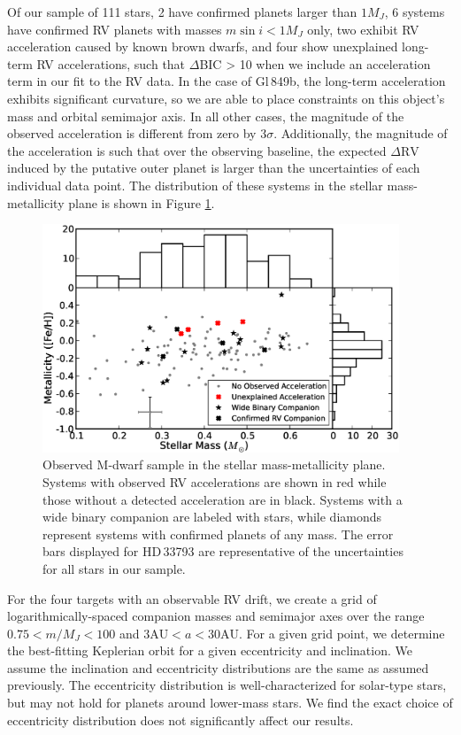 Of our sample of 111 stars, 2 have confirmed planets larger than $1 M_J$, 6 systems have confirmed RV planets with masses $m \sin i < 1 M_J$ only, two exhibit RV acceleration caused by known brown dwarfs, and four show unexplained long-term RV accelerations, such that $\Delta$BIC > 10 when we include an acceleration term in our fit to the RV data. In the case of Gl\,849b, the long-term acceleration exhibits significant curvature, so we are able to place constraints on this object's mass and orbital semimajor axis. In all other cases, the magnitude of the observed acceleration is different from zero by $3\sigma$. Additionally, the magnitude of the acceleration is such that over the observing baseline, the expected $\Delta\textrm{RV}$ induced by the putative outer planet is larger than the uncertainties of each individual data point. The distribution of these systems in the stellar mass-metallicity plane is shown in Figure \ref{massmetal}.

 
\begin{figure}[htbp]
\centerline{\includegraphics[width=0.95\textwidth,trim={0 0 0 0}, clip=true]{chapter3/f5.eps}}
\caption[Observed M-dwarf sample in the stellar mass-metallicity plane]{Observed M-dwarf sample in the stellar mass-metallicity plane. Systems with observed RV accelerations are shown in red while those without a detected acceleration are in black. Systems with a wide binary companion are labeled with stars, while diamonds represent systems with confirmed planets of any mass. The error bars displayed for HD\,33793 are representative of the uncertainties for all stars in our sample.
  }
\label{massmetal}
\end{figure}


For the four targets with an observable RV drift, we create a grid of logarithmically-spaced companion masses and semimajor axes over the range $0.75 < m/M_J < 100$ and $3 \textrm{AU} < a < 30 \textrm{AU}$. For a given grid point, we determine the best-fitting Keplerian orbit for a given eccentricity and inclination. We assume the inclination and eccentricity distributions are the same as assumed previously. The eccentricity distribution is well-characterized for solar-type stars, but may not hold for planets around lower-mass stars. We find the exact choice of eccentricity distribution does not significantly affect our results.

